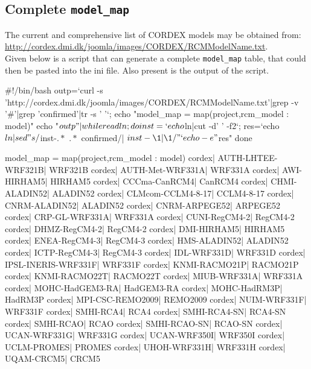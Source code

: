 \subsection{Complete \texttt{model\_map}}
The current and comprehensive list of CORDEX models may be obtained from:\\
\url{http://cordex.dmi.dk/joomla/images/CORDEX/RCMModelName.txt}. \\
Given below is a script that can generate a complete \texttt{model\_map} table, that could then be pasted into the ini file. Also present is the output of the script.
\begin{tiny}
\begin{verbatimtab}[4]
#!/bin/bash
outp=`curl -s 'http://cordex.dmi.dk/joomla/images/CORDEX/RCMModelName.txt'|grep -v '#'|grep 'confirmed'|tr -s ' '`;
echo "model_map = map(project,rcm_model : model)"
echo "$outp" |while read ln; do
        inst=`echo $ln|cut -d' ' -f2`;
        res=`echo $ln| sed "s/$inst-\(.*\) \(.*\) confirmed/\tcordex| $inst-\1| \1/"`
        echo -e "$res"
done

model_map = map(project,rcm_model : model)
        cordex| AUTH-LHTEE-WRF321B| WRF321B
        cordex| AUTH-Met-WRF331A| WRF331A
        cordex| AWI-HIRHAM5| HIRHAM5
        cordex| CCCma-CanRCM4| CanRCM4
        cordex| CHMI-ALADIN52| ALADIN52
        cordex| CLMcom-CCLM4-8-17| CCLM4-8-17
        cordex| CNRM-ALADIN52| ALADIN52
        cordex| CNRM-ARPEGE52| ARPEGE52
        cordex| CRP-GL-WRF331A| WRF331A
        cordex| CUNI-RegCM4-2| RegCM4-2
        cordex| DHMZ-RegCM4-2| RegCM4-2
        cordex| DMI-HIRHAM5| HIRHAM5
        cordex| ENEA-RegCM4-3| RegCM4-3
        cordex| HMS-ALADIN52| ALADIN52
        cordex| ICTP-RegCM4-3| RegCM4-3
        cordex| IDL-WRF331D| WRF331D
        cordex| IPSL-INERIS-WRF331F| WRF331F
        cordex| KNMI-RACMO21P| RACMO21P
        cordex| KNMI-RACMO22T| RACMO22T
        cordex| MIUB-WRF331A| WRF331A
        cordex| MOHC-HadGEM3-RA| HadGEM3-RA
        cordex| MOHC-HadRM3P| HadRM3P
        cordex| MPI-CSC-REMO2009| REMO2009
        cordex| NUIM-WRF331F| WRF331F
        cordex| SMHI-RCA4| RCA4
        cordex| SMHI-RCA4-SN| RCA4-SN
        cordex| SMHI-RCAO| RCAO
        cordex| SMHI-RCAO-SN| RCAO-SN
        cordex| UCAN-WRF331G| WRF331G
        cordex| UCAN-WRF350I| WRF350I
        cordex| UCLM-PROMES| PROMES
        cordex| UHOH-WRF331H| WRF331H
        cordex| UQAM-CRCM5| CRCM5
\end{verbatimtab}
\end{tiny}

